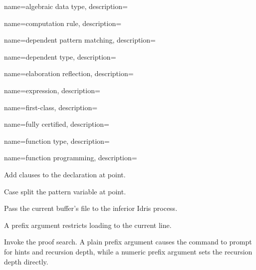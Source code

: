 {
  name={algebraic data type},
  description={}
}

{
  name={computation rule},
  description={}
}

{
  name={dependent pattern matching},
  description={}
}


{
  name={dependent type},
  description={}
}

{
  name={elaboration reflection},
  description={}
}

{
  name={expression},
  description={}
}

{
  name={first-class},
  description={}
}

{
  name={fully certified},
  description={}
}

{
  name={function type},
  description={}
}

{
  name={function programming},
  description={}
}


{

  Add clauses to the declaration at point.
}

{

  Case split the pattern variable at point.
}

{

  Pass the current buffer’s file to the inferior Idris process.

  A prefix argument restricts loading to the current line.
}

{

  Invoke the proof search. A plain prefix argument causes the
  command to prompt for hints and recursion depth, while a numeric
  prefix argument sets the recursion depth directly.
}


